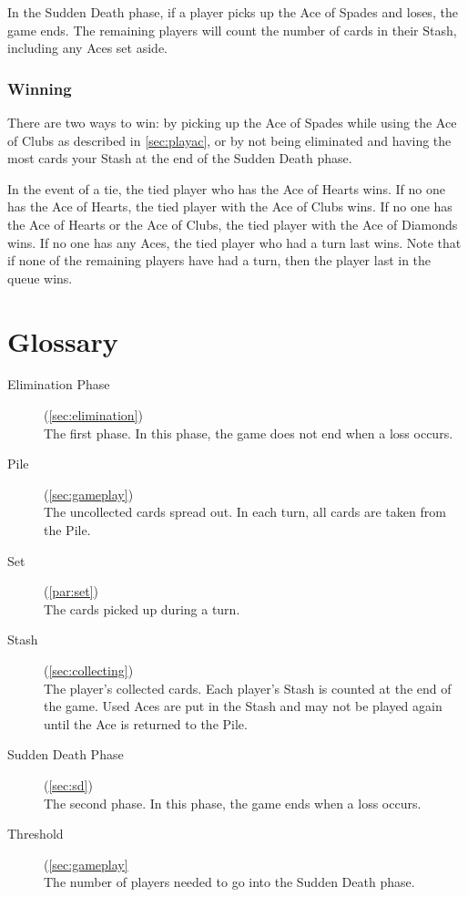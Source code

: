 \documentclass{article}
\begin{document}
In the Sudden Death phase, if a player picks up the Ace of Spades and
loses, the game ends. The remaining players will count the number of
cards in their Stash, including any Aces set aside.

\subsubsection{Winning}

There are two ways to win: by picking up the Ace of Spades while using
the Ace of Clubs as described in \ref{sec:playac}, or by not being
eliminated and having the most cards your Stash at the end of the Sudden
Death phase.

In the event of a tie, the tied player who has the Ace of Hearts wins.
If no one has the Ace of Hearts, the tied player with the Ace of Clubs
wins. If no one has the Ace of Hearts or the Ace of Clubs, the tied
player with the Ace of Diamonds wins. If no one has any Aces, the tied
player who had a turn last wins. Note that if none of the remaining
players have had a turn, then the player last in the queue wins.

\section{Glossary}
\begin{description}
  \item[Elimination Phase](\ref{sec:elimination})\\
    The first phase. In this phase, the game does not end when a loss
    occurs.
  \item[Pile](\ref{sec:gameplay})\\
    The uncollected cards spread out. In each turn, all cards are taken
    from the Pile.
  \item[Set](\ref{par:set})\\
    The cards picked up during a turn.
  \item[Stash](\ref{sec:collecting})\\
    The player's collected cards. Each player's Stash is
    counted at the end of the game. Used Aces are put in the Stash and
    may not be played again until the Ace is returned to the Pile.
  \item[Sudden Death Phase](\ref{sec:sd})\\
    The second phase. In this phase, the game ends when a loss occurs.
  \item[Threshold](\ref{sec:gameplay}\\
    The number of players needed to go into the Sudden
    Death phase.
\end{description}
\end{document}
